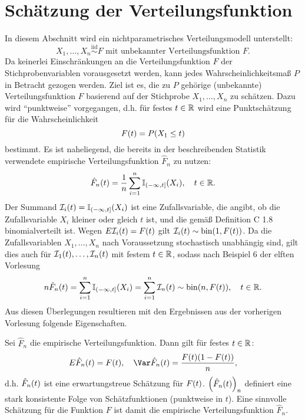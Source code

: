 \documentclass{lecture}
\begin{document}
    \section*{Schätzung der Verteilungsfunktion}

    In diesem Abschnitt wird ein nichtparametrisches Verteilungsmodell unterstellt:
    \[
        X_1, \ldots, X_n \stackrel{\text{iid}}{\sim}F\text{ mit unbekannter Verteilungsfunktion }F.
    \]
    Da keinerlei Einschränkungen an die Verteilungsfunktion \(F\) der Stichprobenvariablen vorausgesetzt werden, kann jedes Wahrscheinlichkeitsmaß \(P\) in Betracht gezogen werden.
    Ziel ist es, die zu \(P\) gehörige (unbekannte) Verteilungsfunktion \(F\) basierend auf der Stichprobe \(X_1, \ldots, X_n\) zu schätzen.
    Dazu wird ``punktweise'' vorgegangen, d.h. für festes \(t \in \mathbb{R}\) wird eine Punktschätzung für die Wahrscheinlichkeit
    \[
        F\parentheses*{t} = P\parentheses*{X_1 \le t}
    \]
    bestimmt.
    Es ist naheliegend, die bereits in der beschreibenden Statistik verwendete empirische Verteilungsfunktion \(\hat{F}_n\) zu nutzen:
    \[
        \hat{F}_n\parentheses*{t} = \frac{1}{n}\sum_{i = 1}^n \mathbb{I}_{\left(-\infty, t\right]}\parentheses*{X_i}, \quad t \in \R.
    \]
    Der Summand \(\mathcal{I}_i\parentheses*{t} = \mathbb{I}_{\left(-\infty, t\right]}\parentheses*{X_i}\) ist eine Zufallsvariable, die angibt, ob die Zufallsvariable \(X_i\) kleiner oder gleich \(t\) ist, und die gemäß Definition C 1.8 binomialverteilt ist.
    Wegen \(E\mathcal{I}_i\parentheses*{t} = F\parentheses*{t}\) gilt \(\mathcal{I}_i\parentheses*{t} \sim \bin\parentheses*{1, F\parentheses*{t}}\).
    Da die Zufallsvariablen \(X_1, \ldots, X_n\) nach Voraussetzung stochastisch unabhängig sind, gilt dies auch für \(\mathcal{I}_1\parentheses*{t}, \ldots, \mathcal{I}_n\parentheses*{t}\) mit festem \(t \in \mathbb{R}\), sodass nach Beispiel 6 der elften Vorlesung
    \[
        n\hat{F}_n\parentheses*{t} = \sum_{i = 1}^n \mathbb{I}_{\left(-\infty, t\right]}\parentheses*{X_i} = \sum_{i = 1}^n \mathcal{I}_n\parentheses*{t} \sim \bin\parentheses*{n, F\parentheses*{t}}, \quad t \in \R.
    \]
    Aus diesen Überlegungen resultieren mit den Ergebnissen aus der vorherigen Vorlesung folgende Eigenschaften.

    \begin{theorem}
        Sei \(\hat{F}_n\) die empirische Verteilungsfunktion.
        Dann gilt für festes \(t \in \mathbb{R}\):
        \[
            E\hat{F}_n\parentheses*{t} = F\parentheses*{t}, \quad \Var\hat{F}_n\parentheses*{t} = \frac{F\parentheses*{t}\parentheses*{1 - F\parentheses*{t}}}{n},
        \]
        d.h. \(\hat{F}_n\parentheses*{t}\) ist eine erwartungstreue Schätzung für \(F\parentheses*{t}\).
        \(\parentheses*{\hat{F}_n\parentheses*{t}}_n\) definiert eine stark konsistente Folge von Schätzfunktionen (punktweise in \(t\)).
        Eine sinnvolle Schätzung für die Funktion \(F\) ist damit die empirische Verteilungsfunktion \(\hat{F}_n\).
    \end{theorem}
\end{document}
